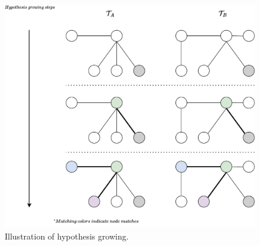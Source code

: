 \begin{figure}[h]
    \centering
    \includegraphics*[width=\textwidth]{./fig/hypothesis_growing.drawio.pdf}
    \caption{Illustration of hypothesis growing.}
    \label{fig:hgrowing}
\end{figure}
